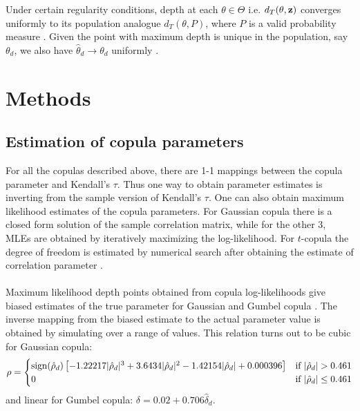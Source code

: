 \documentclass[11pt]{llncs}
\begin{document}
Under certain regularity conditions, depth at each $\theta\in\Theta$ i.e. $d_T(\theta,{\bf{z}})$ converges uniformly to its population analogue $d_T(\theta,P)$, where $P$ is a valid probability measure \cite{mizera1}\cite{mizera2}. Given the point with maximum depth is unique in the population, say $\theta_d$, we also have $\hat\theta_d\rightarrow \theta_d$ uniformly \cite{denecke2010}.


\section{Methods}
\subsection{Estimation of copula parameters}For all the copulas described above, there are 1-1 mappings between the copula parameter and Kendall's $\tau$\cite{4copulas}. Thus one way to obtain parameter estimates is inverting from the sample version of Kendall's $\tau$. One can also obtain maximum likelihood estimates of the copula parameters. For Gaussian copula there is a closed form solution of the sample correlation matrix, while for the other 3, MLEs are obtained by iteratively maximizing the log-likelihood. For $t$-copula the degree of freedom is estimated by numerical search after obtaining the estimate of correlation parameter \cite{mashal}.

\paragraph{}Maximum likelihood depth points obtained from copula log-likelihoods give biased estimates of the true parameter for Gaussian and Gumbel copula \cite{copdepth}. The inverse mapping from the biased estimate to the actual parameter value is obtained by simulating over a range of values. This relation turns out to be cubic for Gaussian copula:
$$ \rho = \begin{cases}
\operatorname*{sign}(\hat\rho_d)\left[-1.22217|\hat\rho_d|^3 + 3.6434|\hat\rho_d|^2 - 1.42154|\hat\rho_d| + 0.000396\right]
&\mbox{if } |\hat\rho_d| > 0.461\\ 0 &\mbox{if }|\hat\rho_d| \leq 0.461
\end{cases}$$
and linear for Gumbel copula: $ \delta = 0.02 + 0.706\hat\delta_d $.
\end{document}

